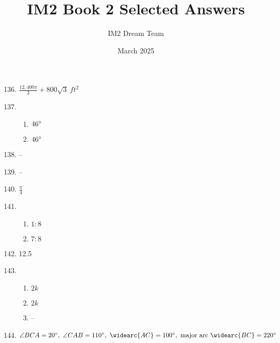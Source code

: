 \documentclass{article}
\title{IM2 Book 2 Selected Answers}
\author{IM2 Dream Team}
\date{March 2025}
\begin{document}
\maketitle

\begin{enumerate}

\setcounter{enumi}{135}

\item $\frac{12,400 \pi}{3} + 800 \sqrt{3} \ ft^2$

\item

	\begin{enumerate}
	
	\item $46 \degree$
	
	\item $46 \degree$
	
	\end{enumerate}
	
\item -- 

\item --

\item $\frac{\pi}{4}$

\item 

	\begin{enumerate}
	
	\item $1:8$
	
	\item $7:8$
	
	\end{enumerate}
	
\item 12.5

\item

	\begin{enumerate}
	
	\item $2k$
	
	\item $2k$
	
	\item --
	
	\end{enumerate}
	
\item $\angle BCA = 20 \degree, \ \angle CAB = 110 \degree, \ \widearc{AC} = 100 \degree, \ \text{major arc } \widearc{BC} = 220 \degree$


\end{enumerate}
\end{document}
